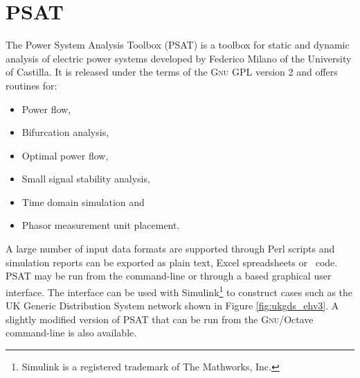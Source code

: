 \section{PSAT}
\label{sec:psat}
The Power System Analysis Toolbox (PSAT) is a \matlab toolbox for static and
dynamic analysis of electric power systems developed by Federico Milano of the
University of Castilla. It is released under the terms of the \textsc{Gnu} GPL
version 2 and offers routines for:
\begin{itemize}
	\item Power flow,
	\item Bifurcation analysis,
	\item Optimal power flow,
	\item Small signal stability analysis,
	\item Time domain simulation and
	\item Phasor measurement unit placement.
\end{itemize}
A large number of input data formats are supported through Perl scripts and
simulation reports can be exported as plain text, Excel spreadsheets or
\LaTeXe~code.  PSAT may be run from the \matlab command-line or through a
\matlab based graphical user interface.  The interface can be used with
Simulink\footnote{Simulink is a registered trademark of The Mathworks, Inc.}
to construct cases such as the UK Generic Distribution System network
shown in Figure \ref{fig:ukgds_ehv3}.  A slightly modified version of PSAT that
can be run from the \textsc{Gnu}/Octave command-line is also available.


